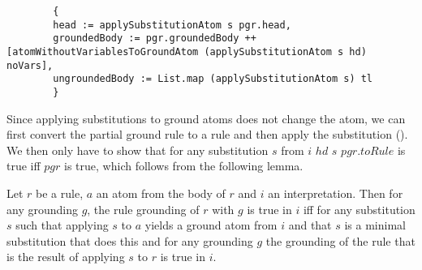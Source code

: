     \begin{lstlisting}
        {
        head := applySubstitutionAtom s pgr.head,
        groundedBody := pgr.groundedBody ++ [atomWithoutVariablesToGroundAtom (applySubstitutionAtom s hd) noVars],
        ungroundedBody := List.map (applySubstitutionAtom s) tl
        }
    \end{lstlisting}

    Since applying substitutions to ground atoms does not change the atom, we can first convert the partial ground rule to a rule and then apply the substitution (\swapPgrApplySubstitution). We then only have to show that for any substitution $s$ from \getSubstitutions $i$ $hd$ \applySubstitutionRule $s$ $pgr.toRule$ is true iff $pgr$ is true, which follows from the following lemma.

    \begin{lemma}[\replaceGroundingWithSubstitutionAndGrounding]
        Let $r$ be a rule, $a$ an atom from the body of $r$ and $i$ an interpretation. Then for any grounding $g$, the rule grounding of $r$ with $g$ is true in $i$ iff for any substitution $s$ such that applying $s$ to $a$ yields a ground atom from $i$ and that $s$ is a minimal substitution that does this and for any grounding $g$ the grounding of the rule that is the result of applying $s$ to $r$ is true in $i$. 
    \end{lemma}
